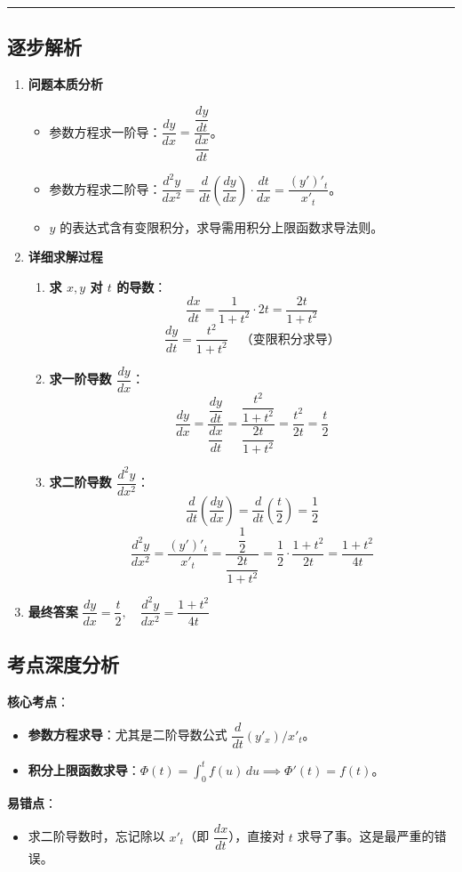 \documentclass[UTF8,10pt]{ctexart}
\newenvironment{redenv}{\color{red}}{}
\newenvironment{detailedanalysis}{%
    \color{red}
    \begin{enumerate}[label=\textbf{第\arabic*步：}, leftmargin=*, align=left, itemsep=0pt, parsep=0pt, topsep=0pt, partopsep=0pt]
}{%
    \end{enumerate}
}
\newenvironment{conceptbox}{%
    \begin{tcolorbox}[colback=red!5, colframe=red!50!black, title=概念解析, fonttitle=\bfseries, top=2pt, bottom=2pt, left=2pt, right=2pt]
}{%
    \end{tcolorbox}
}
\newcommand{\analysisrule}{\noindent\rule{\textwidth}{0.8pt}\vspace{-0.5em}}
\begin{document}
\begin{redenv}
\analysisrule
\subsection*{逐步解析}

\begin{detailedanalysis}
\item \textbf{问题本质分析}
\begin{itemize}
    \item 参数方程求一阶导：$\dfrac{dy}{dx} = \dfrac{\dfrac{dy}{dt}}{\dfrac{dx}{dt}}$。
    \item 参数方程求二阶导：$\dfrac{d^2y}{dx^2} = \dfrac{d}{dt}\left(\dfrac{dy}{dx}\right) \cdot \dfrac{dt}{dx} = \dfrac{(y')'_t}{x'_t}$。
    \item $y$ 的表达式含有变限积分，求导需用积分上限函数求导法则。
\end{itemize}

\item \textbf{详细求解过程}
\begin{enumerate}[label=(\alph*)]
    \item \textbf{求 $x, y$ 对 $t$ 的导数}：
    \[ \dfrac{dx}{dt} = \dfrac{1}{1+t^2} \cdot 2t = \dfrac{2t}{1+t^2} \]
    \[ \dfrac{dy}{dt} = \dfrac{t^2}{1+t^2} \quad \text{（变限积分求导）} \]
    \item \textbf{求一阶导数 $\dfrac{dy}{dx}$}：
    \[ \dfrac{dy}{dx} = \dfrac{\dfrac{dy}{dt}}{\dfrac{dx}{dt}} = \dfrac{\dfrac{t^2}{1+t^2}}{\dfrac{2t}{1+t^2}} = \dfrac{t^2}{2t} = \dfrac{t}{2} \]
    \item \textbf{求二阶导数 $\dfrac{d^2y}{dx^2}$}：
    \[ \dfrac{d}{dt}\left(\dfrac{dy}{dx}\right) = \dfrac{d}{dt}\left(\dfrac{t}{2}\right) = \dfrac{1}{2} \]
    \[ \dfrac{d^2y}{dx^2} = \dfrac{(y')'_t}{x'_t} = \dfrac{\dfrac{1}{2}}{\dfrac{2t}{1+t^2}} = \dfrac{1}{2} \cdot \dfrac{1+t^2}{2t} = \dfrac{1+t^2}{4t} \]
\end{enumerate}

\item \textbf{最终答案}
$\dfrac{dy}{dx} = \dfrac{t}{2}, \quad \dfrac{d^2y}{dx^2} = \dfrac{1+t^2}{4t}$
\end{detailedanalysis}

\subsection*{考点深度分析}
\begin{conceptbox}
\textbf{核心考点}：
\begin{itemize}
    \item \textbf{参数方程求导}：尤其是二阶导数公式 $\dfrac{d}{dt}(y'_x) / x'_t$。
    \item \textbf{积分上限函数求导}：$\Phi(t) = \int_0^t f(u)\, du \implies \Phi'(t) = f(t)$。
\end{itemize}
\textbf{易错点}：
\begin{itemize}
    \item 求二阶导数时，忘记除以 $x'_t$（即 $\dfrac{dx}{dt}$），直接对 $t$ 求导了事。这是最严重的错误。
\end{itemize}
\end{conceptbox}
\end{redenv}
\end{document}
